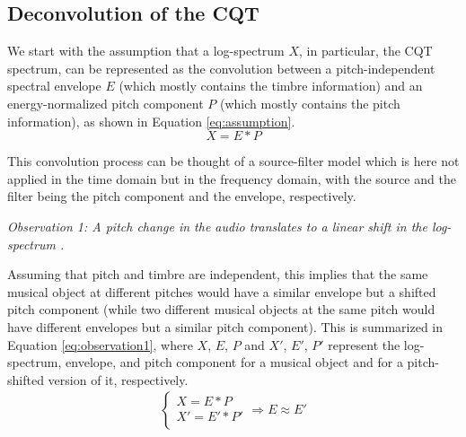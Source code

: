 \documentclass[journal]{IEEEtran}
\begin{document}


\subsection{Deconvolution of the CQT}

We start with the assumption that a log-spectrum $X$, in particular, the CQT spectrum, can be represented as the convolution between a pitch-independent spectral envelope $E$ (which mostly contains the timbre information) and an energy-normalized pitch component $P$ (which mostly contains the pitch information), as shown in Equation \ref{eq:assumption}. 
\begin{equation}
\label{eq:assumption}
X = E * P
\end{equation}

This convolution process can be thought of a source-filter model \cite{fant1970} which is here not applied in the time domain but in the frequency domain, with the source and the filter being the pitch component and the envelope, respectively.

\emph{Observation 1: A pitch change in the audio translates to a linear shift in the log-spectrum \cite{brown1991, brown1992}.}

Assuming that pitch and timbre are independent, this implies that the same musical object at different pitches would have a similar envelope but a shifted pitch component (while two different musical objects at the same pitch would have different envelopes but a similar pitch component). This is summarized in Equation \ref{eq:observation1}, where $X$, $E$, $P$ and $X'$, $E'$, $P'$ represent the log-spectrum, envelope, and pitch component for a musical object and for a pitch-shifted version of it, respectively.
\begin{equation}
\label{eq:observation1}
\begin{split}
\begin{cases}
X = E * P \\
X' = E' * P' \\
\end{cases}
\Rightarrow E \approx E'
\end{split}
\end{equation}
\end{document}
